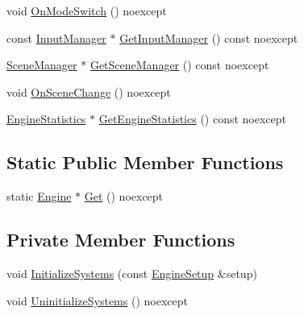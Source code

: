 \begin{DoxyCompactItemize}
void \hyperlink{classmage_1_1_engine_a6ac289fd093967c370955810e26d251f}{On\+Mode\+Switch} () noexcept
\item 
const \hyperlink{classmage_1_1_input_manager}{Input\+Manager} $\ast$ \hyperlink{classmage_1_1_engine_a9e8de859024c2b51d9b20ce498d6c07b}{Get\+Input\+Manager} () const noexcept
\item 
\hyperlink{classmage_1_1_scene_manager}{Scene\+Manager} $\ast$ \hyperlink{classmage_1_1_engine_adaec74f633fe6ed3a3e2ec745cd57343}{Get\+Scene\+Manager} () const noexcept
\item 
void \hyperlink{classmage_1_1_engine_a4bcc8811433865c349c8cc862d4f457d}{On\+Scene\+Change} () noexcept
\item 
\hyperlink{classmage_1_1_engine_statistics}{Engine\+Statistics} $\ast$ \hyperlink{classmage_1_1_engine_aacbd029d5e8f00e0acdb0f4d7cc04236}{Get\+Engine\+Statistics} () const noexcept
\end{DoxyCompactItemize}
\subsection*{Static Public Member Functions}
\begin{DoxyCompactItemize}
\item 
static \hyperlink{classmage_1_1_engine}{Engine} $\ast$ \hyperlink{classmage_1_1_engine_a146c8898afd978b4d1f0528128a43bbf}{Get} () noexcept
\end{DoxyCompactItemize}
\subsection*{Private Member Functions}
\begin{DoxyCompactItemize}
\item 
void \hyperlink{classmage_1_1_engine_a29a47448fb182b110d46d287a72b8b4e}{Initialize\+Systems} (const \hyperlink{structmage_1_1_engine_setup}{Engine\+Setup} \&setup)
\item 
void \hyperlink{classmage_1_1_engine_ac0632bce91156f13d4bc76f5b25fc94b}{Uninitialize\+Systems} () noexcept
\end{DoxyCompactItemize}
